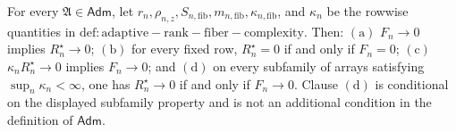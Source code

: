For every \(\mathfrak A\in\mathsf{Adm}\), let \(r_n,\rho_{n,z},S_{n,\mathrm{fib}},m_{n,\mathrm{fib}},\kappa_{n,\mathrm{fib}}\), and \(\kappa_n\) be the rowwise quantities in \(\mathrm{def:adaptive-rank-fiber-complexity}\). Then: \(\mathrm{(a)}\) \(F_n\to0\) implies \(R_n^{\star}\to0\); \(\mathrm{(b)}\) for every fixed row, \(R_n^{\star}=0\) if and only if \(F_n=0\); \(\mathrm{(c)}\) \(\kappa_nR_n^{\star}\to0\) implies \(F_n\to0\); and \(\mathrm{(d)}\) on every subfamily of arrays satisfying \(\sup_n\kappa_n<\infty\), one has \(R_n^{\star}\to0\) if and only if \(F_n\to0\). Clause \(\mathrm{(d)}\) is conditional on the displayed subfamily property and is not an additional condition in the definition of \(\mathsf{Adm}\).